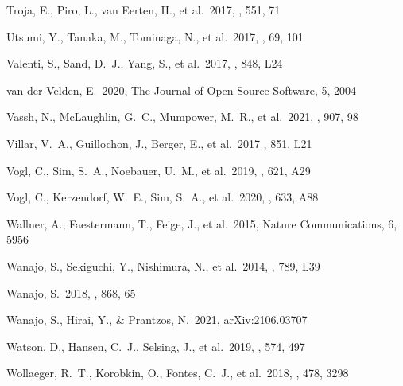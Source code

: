 \documentclass[twocolumn, twocolappendix]{aastex63}
\begin{document}
\begin{thebibliography}{}
 Troja, E., Piro, L., van Eerten, H., et al.\ 2017, \nat, 551, 71


 Utsumi, Y., Tanaka, M., Tominaga, N., et al.\ 2017, \pasj, 69, 101


 Valenti, S., Sand, D.~J., Yang, S., et al.\ 2017, \apjl, 848, L24


 van der Velden, E.\ 2020, The Journal of Open Source Software, 5, 2004


 Vassh, N., McLaughlin, G.~C., Mumpower, M.~R., et al.\ 2021, \apj, 907, 98


Villar, V.~A., Guillochon, J., Berger, E., et al.\ 2017 \aj, 851, L21




 Vogl, C., Sim, S.~A., Noebauer, U.~M., et al.\ 2019, \aap, 621, A29


 Vogl, C., Kerzendorf, W.~E., Sim, S.~A., et al.\ 2020, \aap, 633, A88


 Wallner, A., Faestermann, T., Feige, J., et al.\ 2015, Nature Communications, 6, 5956


 Wanajo, S., Sekiguchi, Y., Nishimura, N., et al.\ 2014, \apjl, 789, L39


 Wanajo, S.\ 2018, \apj, 868, 65


 Wanajo, S., Hirai, Y., \& Prantzos, N.\ 2021, arXiv:2106.03707




 Watson, D., Hansen, C.~J., Selsing, J., et al.\ 2019, \nat, 574, 497


 Wollaeger, R.~T., Korobkin, O., Fontes, C.~J., et al.\ 2018, \mnras, 478, 3298



\end{thebibliography}
\end{document}
